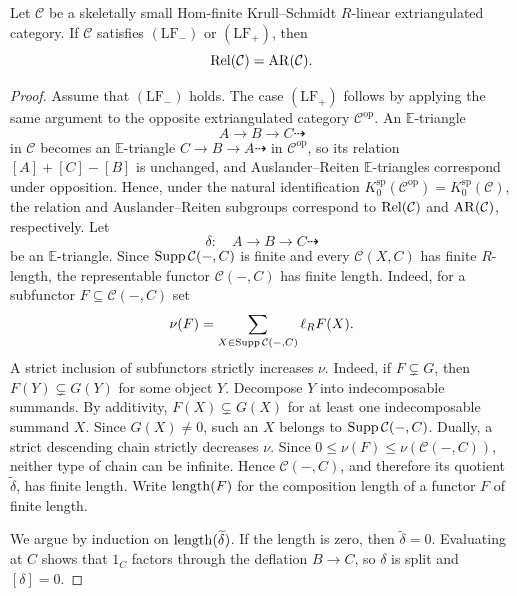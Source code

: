 \documentclass[11pt, twoside]{article}
\def\C{\mathcal{C}}
\def\E{\mathbb{E}}
\numberwithin{equation}{section}
\begin{document}
\begin{theorem}\label{thm:one-sided-relations}
Let $\C$ be a skeletally small Hom-finite Krull--Schmidt $R$-linear
extriangulated category.  If $\C$ satisfies $(\mathrm{LF}_-)$ or $(\mathrm{LF}_+)$, then
\[
 \Rel(\C)=\AR(\C).
\]
\end{theorem}

\begin{proof}
Assume that $(\mathrm{LF}_-)$ holds.  The case $(\mathrm{LF}_+)$ follows by applying
the same argument to the opposite extriangulated category
$\C^{\mathrm{op}}$.  An $\E$-triangle $$A\to B\to C\dashrightarrow$$ in $\C$ becomes an $\E$-triangle
$C\to B\to A\dashrightarrow$ in $\C^{\mathrm{op}}$, so its relation
$[A]+[C]-[B]$ is unchanged, and Auslander--Reiten $\E$-triangles correspond under
opposition.  Hence, under the natural identification
$K_0^{\mathrm{sp}}(\C^{\mathrm{op}})=K_0^{\mathrm{sp}}(\C)$, the relation
and Auslander--Reiten subgroups correspond to $\Rel(\C)$ and $\AR(\C)$,
respectively.
Let
\[
 \delta:\quad A\longrightarrow B\longrightarrow C\dashrightarrow
\]
be an $\E$-triangle.  Since $\Supp\C(-,C)$ is finite and every $\C(X,C)$ has finite
$R$-length, the representable functor $\C(-,C)$ has finite length.  Indeed,
for a subfunctor $F\subseteq\C(-,C)$ set
\[
 \nu(F)=\sum_{X\in\Supp\C(-,C)}\ell_R F(X).
\]
A strict inclusion of subfunctors strictly increases $\nu$.  Indeed, if
$F\subsetneq G$, then $F(Y)\subsetneq G(Y)$ for some object $Y$.  Decompose
$Y$ into indecomposable summands.  By additivity,
$F(X)\subsetneq G(X)$ for at least one indecomposable summand $X$.  Since
$G(X)\ne0$, such an $X$ belongs to $\Supp\C(-,C)$.
 Dually, a strict descending
chain strictly decreases $\nu$.  Since
$0\le\nu(F)\le\nu(\C(-,C))$, neither type of chain can be infinite.
Hence $\C(-,C)$, and therefore its quotient $\widetilde\delta$, has finite
length.  Write $\operatorname{length}(F)$ for
the composition length of a functor $F$ of finite length.

We argue by induction on $\operatorname{length}(\widetilde\delta)$.  If the length is
zero, then $\widetilde\delta=0$.  Evaluating at $C$ shows that $1_C$
factors through the deflation $B\to C$, so $\delta$ is split and
$[\delta]=0$.


\end{proof}
\end{document}
